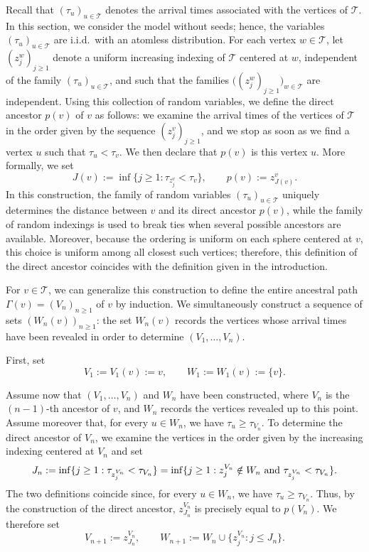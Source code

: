 \documentclass[french]{article}
\newcommand{\zi}{z}
\newcommand{\T}{\mathcal{T}}
\renewcommand{\1}{\mathds{1}}
\begin{document}
Recall that $(\tau_u)_{u \in \T}$ denotes the arrival times associated with the vertices of $\T$. In this section, we consider the model without seeds; hence, the variables $(\tau_u)_{u \in \T}$ are i.i.d.\ with an atomless distribution.
For each vertex $w \in \T$, let $(\zi_j^w)_{j \geq 1}$ denote a uniform increasing indexing of $\T$ centered at $w$, independent of the family $(\tau_u)_{u \in \T}$, and such that the families $\bigl((\zi_j^w)_{j \geq 1}\bigr)_{w \in \T}$ are independent.
Using this collection of random variables, we define the direct ancestor $p(v)$ of $v$ as follows: we examine the arrival times of the vertices of $\T$ in the order given by the sequence $(\zi_j^v)_{j \ge 1}$, and we stop as soon as we find a vertex $u$ such that $\tau_u < \tau_v$. We then declare that $p(v)$ is this vertex $u$. More formally, we set
\[
J(v):=\inf\{j\ge 1:\tau_{\zi_j^v}<\tau_v\},
\qquad
p(v):=\zi_{J(v)}^v.
\]
In this construction, the family of random variables $(\tau_u)_{u \in \T}$ uniquely determines the distance between $v$ and its direct ancestor $p(v)$, while the family of random indexings is used to break ties when several possible ancestors are available. Moreover, because the ordering is uniform on each sphere centered at $v$, this choice is uniform among all closest such vertices; therefore, this definition of the direct ancestor coincides with the definition given in the introduction.


For $v \in \T$, we can generalize this construction to define the entire ancestral path $\Gamma(v)=(V_n)_{n \ge 1}$ of $v$ by induction. We simultaneously construct a sequence of sets $(W_n(v))_{n \ge 1}$: the set $W_n(v)$ records the vertices whose arrival times have been revealed in order to determine $(V_1,\ldots,V_n)$.

\medskip

First, set
\[
V_1 := V_1(v) := v,
\qquad
W_1 := W_1(v) := \{v\}.
\]

Assume now that $(V_1,\dots,V_n)$ and $W_n$ have been constructed, where $V_n$ is the $(n-1)$-th ancestor of $v$, and $W_n$ records the vertices revealed up to this point. Assume moreover that, for every $u \in W_n$, we have $\tau_u \ge \tau_{V_n}$.
To determine the direct ancestor of $V_n$, we examine the vertices in the order given by the increasing indexing centered at $V_n$ and set
\[
J_n := \inf\{j \ge 1 : \tau_{\zi_j^{V_n}} < \tau_{V_n}\}
     = \inf\{j \ge 1 : \zi_j^{V_n} \notin W_n \hbox{ and } \tau_{\zi_j^{V_n}} < \tau_{V_n}\}.
\]
The two definitions coincide since, for every $u \in W_n$, we have $\tau_u \ge \tau_{V_n}$.
Thus, by the construction of the direct ancestor, $\zi_{J_n}^{V_n}$ is precisely equal to $p(V_n)$. We therefore set
\begin{equation}\label{eq:defvraiVn}
 V_{n+1} := \zi_{J_n}^{V_n},
\qquad
W_{n+1} := W_n \cup \{\zi_j^{V_n} : j \le J_n\}.
\end{equation}
\end{document}
